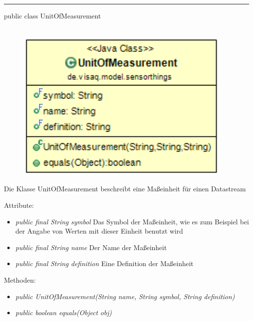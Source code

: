 \rule{\textwidth}{0.4pt}
public class UnitOfMeasurement
\\\\
\begin{minipage}{0.4\textwidth}
    \begin{figure}[H]
        {\centering\includegraphics[width=0.95\textwidth]{media/backend/modell/classes/UnitOfMeasurement.png}}
    \end{figure}
    \end{minipage} \hfill
\begin{minipage}{0.6\textwidth}
    Die Klasse UnitOfMeasurement beschreibt eine Maßeinheit für einen Datastream
\end{minipage}

Attribute:
\begin{itemize}
    \item \emph{public final String symbol} Das Symbol der Maßeinheit, wie es zum Beispiel bei der Angabe von Werten mit dieser Einheit benutzt wird
    \item \emph{public final String name} Der Name der Maßeinheit
    \item \emph{public final String definition} Eine Definition der Maßeinheit
\end{itemize}
Methoden:
\begin{itemize}
    \item \emph{public UnitOfMeasurement(String name, String symbol, String definition)}
    \item \emph{public boolean equals(Object obj)} 
\end{itemize}

